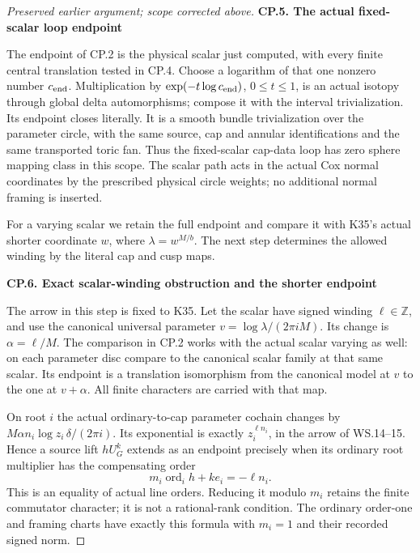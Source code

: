 \begin{proof}[Preserved earlier argument; scope corrected above]
\medskip\noindent\textbf{CP.5. The actual fixed-scalar loop endpoint}

\par\nobreak

The endpoint of CP.2 is the physical scalar just computed, with every
finite central translation tested in CP.4. Choose a logarithm of
that one nonzero number \(c_{\rm end}\). Multiplication by
\(\exp(-t\log c_{\rm end})\), \(0\leq t\leq1\), is an actual
isotopy through global delta automorphisms; compose it with the
interval trivialization. Its endpoint closes literally. It is a
smooth bundle trivialization over the parameter circle, with the
same source, cap and annular identifications and the same transported
toric fan. Thus the fixed-scalar cap-data loop has zero sphere
mapping class in this scope. The scalar path acts in the actual
Cox normal coordinates by the prescribed physical circle weights;
no additional normal framing is inserted.

For a varying scalar we retain the full endpoint and compare it
with K35's actual shorter coordinate \(w\), where
\(\lambda=w^{M/b}\). The next step determines the allowed winding
by the literal cap and cusp maps.

\par

\medskip\noindent\textbf{CP.6. Exact scalar-winding obstruction and the shorter endpoint}

\par\nobreak

The arrow in this step is fixed to K35.
Let the scalar have signed winding \(\ell\in\mathbb Z\), and use
the canonical universal parameter
\(v=\log\lambda/(2\pi iM)\). Its change is
\(\alpha=\ell/M\). The comparison in CP.2 works with the actual
scalar varying as well: on each parameter disc compare to the
canonical scalar family at that same scalar. Its endpoint is a
translation isomorphism from the canonical model at \(v\) to the one
at \(v+\alpha\). All finite characters are carried with that map.

On root \(i\) the actual ordinary-to-cap parameter cochain changes by
\(M\alpha n_i\log z_i\,\delta/(2\pi i)\). Its exponential is
exactly \(z_i^{\ell n_i}\), in the arrow of WS.14--15. Hence a
source lift \(hU_G^k\) extends as an endpoint precisely when its
ordinary root multiplier has the compensating order
\[
             m_i\operatorname{ord}_i h+k e_i=-\ell n_i.
                                                               \tag{CP.7}
\]
This is an equality of actual line orders. Reducing it modulo \(m_i\)
retains the finite commutator character; it is not a rational-rank
condition. The ordinary order-one and framing charts have exactly
this formula with \(m_i=1\) and their recorded signed norm.


\end{proof}
